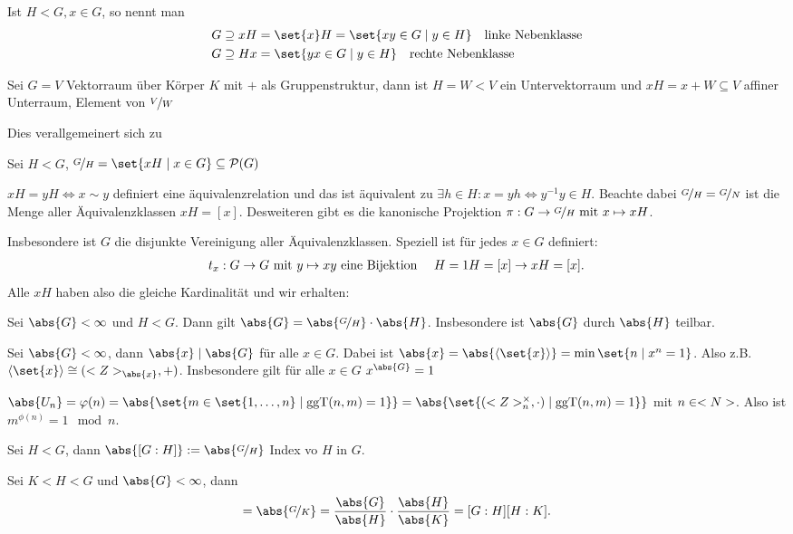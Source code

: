 \begin{definition}
	Ist $H < G, x \in G$, so nennt man
	\begin{align*}
	G \supseteq x H &= \set{x}H = \set{xy \in G \mid y \in H} \quad \text{linke Nebenklasse}\\
	G \supseteq H x &= \set{yx \in G \mid y \in H} \quad \text{rechte Nebenklasse}
	\end{align*}
\end{definition}
\begin{example}
	Sei $G = V$ Vektorraum über Körper $K$ mit $+$ als Gruppenstruktur, dann ist $H = W < V$ ein Untervektorraum und $xH = x + W \subseteq V$ affiner Unterraum, Element von $\lnkset{V}{W}$
\end{example}
Dies verallgemeinert sich zu
\begin{definition}
	Sei $H < G$, $\lnkset{G}{H} = \set{x H \mid x \in G} \subseteq \powerset(G)$
\end{definition}
\begin{remark}
	$xH = yH \Leftrightarrow x \sim y$ definiert eine äquivalenzrelation und das ist äquivalent zu $\exists h \in H: x = yh \Leftrightarrow y^{-1}y \in H$. Beachte dabei $\lnkset{G}{H} = \lnkset{G}{N}$ ist die Menge aller Äquivalenzklassen $xH = [x]$. Desweiteren gibt es die kanonische Projektion $\pi : G \to \lnkset{G}{H} \mit x \mapsto xH$.
\end{remark}
Insbesondere ist $G$ die disjunkte Vereinigung aller Äquivalenzklassen. Speziell ist für jedes $x \in G$ definiert:
\begin{align*}
	t_x : G \to G \mit y \mapsto xy \text{ eine Bijektion } \quad H = 1H = [x] \to xH = [x].
\end{align*}
Alle $xH$ haben also die gleiche Kardinalität und wir erhalten:
\begin{proposition}
	Sei $\abs{G} < \infty$ und $H < G$. Dann gilt $\abs{G} = \abs{\lnkset{G}{H}}\cdot \abs{H}$. Insbesondere ist $\abs{G}$ durch $\abs{H}$ teilbar.
\end{proposition}
\begin{conclusion}
	Sei $\abs{G} < \infty$, dann $\abs{x} \mid \abs{G}$ für alle $x \in G$. Dabei ist $\abs{x} = \abs{\langle \set{x}\rangle} = \min\set{n \mid x^n = 1}$. Also z.B. $\langle \set{x} \rangle \cong (\Z_{\abs{x}},+)$. Insbesondere gilt für alle $x \in G$ $x^{\abs{G}} = 1$
\end{conclusion}
\begin{conclusion}
	$\abs{U_n} = \phi(n) = \abs{\set{m \in \set{1, \dots,n} \mid \ggT(n,m) = 1}} = \abs{\set{(\Z_n^{\times}, \cdot) \mid \ggT(n,m) = 1}}$ mit $n \in \N$. Also ist $m^{\phi(n)} = 1 \mod n$.
\end{conclusion}
\begin{definition}[Index]
	Sei $H < G$, dann $\abs{[G:H]} := \abs{\lnkset{G}{H}}$ Index vo $H$ in $G$.
\end{definition}
\begin{conclusion}
	Sei $K < H < G$ und $\abs{G} < \infty$, dann
	\begin{align*}
		[G:K] = \abs{\lnkset{G}{K}} = \frac{\abs{G}}{\abs{H}}\cdot \frac{\abs{H}}{\abs{K}} = [G:H][H:K].
	\end{align*}
\end{conclusion}
